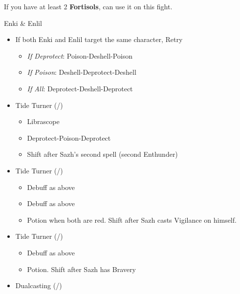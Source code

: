 
If you have at least 2 \textbf{Fortisols}, can use it on this fight.
\vfill
\ 

\renewcommand{\first}{[1] Slash \& Burn (\rav/\com)}
\renewcommand{\second}{[2] Tide Turner (\sab/\syn)}
\renewcommand{\third}{[3] Tide Turner (\sab/\syn)}
\renewcommand{\fourth}{[4] Dualcasting (\rav/\rav)}
\renewcommand{\fifth}{[5] Undermine (\sab/\rav)}
\renewcommand{\sixth}{[6] Divide \& Conquer (\sab/\com)}
\begin{battle}[1:41]{Enki \& Enlil}
		\begin{itemize}
			\item If both Enki and Enlil target the same character, Retry

			      \begin{itemize}
				      \item \textit{If Deprotect}: Poison-Deshell-Poison
				      \item \textit{If Poison}: Deshell-Deprotect-Deshell
				      \item \textit{If All}: Deprotect-Deshell-Deprotect
			      \end{itemize}
			\item \second
			      \begin{itemize}
				      \item Librascope
				      \item Deprotect-Poison-Deprotect
				      \item Shift after Sazh's second spell (second Enthunder)
			      \end{itemize}
			\item \third
			      \begin{itemize}
				      \item Debuff as above
				      \item Debuff as above
				      \item Potion when both are red. Shift after Sazh casts Vigilance on himself.
			      \end{itemize}
			\item \second
			      \begin{itemize}
				      \item Debuff as above
				      \item Potion. Shift after Sazh has Bravery
			      \end{itemize}
			\item \fourth
			      \begin{itemize}

\end{itemize}
\end{itemize}
\end{battle}
